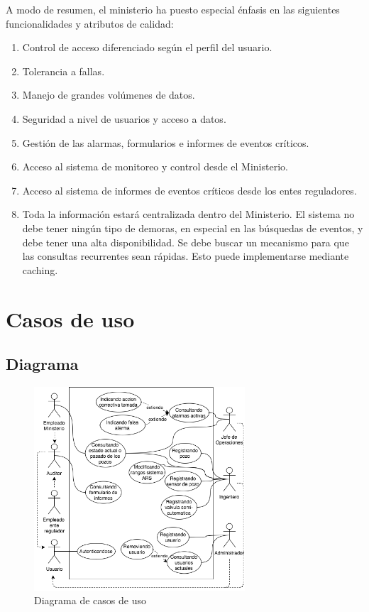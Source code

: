 \documentclass{article}
\theoremstyle{definition}
\theoremstyle{remark}
\begin{document}
A modo de resumen, el ministerio ha puesto especial énfasis en las siguientes funcionalidades y atributos de calidad:
\begin{enumerate}
	\item Control de acceso diferenciado según el perfil del usuario.
	\item Tolerancia a fallas.
	\item Manejo de grandes volúmenes de datos.
	\item Seguridad a nivel de usuarios y acceso a datos.
	\item Gestión de las alarmas, formularios e informes de eventos críticos.
	\item Acceso al sistema de monitoreo y control desde el Ministerio.
	\item Acceso al sistema de informes de eventos críticos desde los entes reguladores.
	\item Toda la información estará centralizada dentro del Ministerio. El sistema no debe tener ningún tipo de demoras, en especial en las búsquedas de eventos, y debe tener una alta disponibilidad. Se debe buscar un mecanismo para que las consultas recurrentes sean rápidas. Esto puede implementarse mediante caching.
\end{enumerate}

\section{Casos de uso}

\subsection{Diagrama}

\begin{figure}[H]
    \centering
    \includegraphics[width=0.7\textwidth]{figures/casosuso.png}
    \caption{Diagrama de casos de uso}
    \label{fig:casosuso}
\end{figure}
\end{document}
